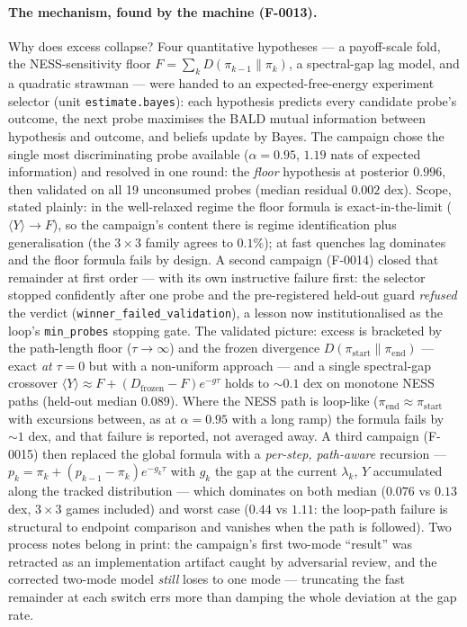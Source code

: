 \paragraph{The mechanism, found by the machine (F-0013).} Why does excess
collapse? Four quantitative hypotheses — a payoff-scale fold, the
NESS-sensitivity floor $F = \sum_k D(\pi_{k-1}\|\pi_k)$, a spectral-gap lag
model, and a quadratic strawman — were handed to an expected-free-energy
experiment selector (unit \texttt{estimate.bayes}): each hypothesis predicts
every candidate probe's outcome, the next probe maximises the BALD mutual
information between hypothesis and outcome, and beliefs update by Bayes. The
campaign chose the single most discriminating probe available
($\alpha = 0.95$, $1.19$ nats of expected information) and resolved in one
round: the \emph{floor} hypothesis at posterior $0.996$, then validated on
all 19 unconsumed probes (median residual $0.002$ dex). Scope, stated
plainly: in the well-relaxed regime the floor formula is exact-in-the-limit
($\langle Y\rangle \to F$), so the campaign's content there is regime
identification plus generalisation (the $3{\times}3$ family agrees to
$0.1\%$); at fast quenches lag dominates and the floor formula fails by design.
A second campaign (F-0014) closed that remainder at first order — with its
own instructive failure first: the selector stopped confidently after one
probe and the pre-registered held-out guard \emph{refused} the verdict
(\texttt{winner\_failed\_validation}), a lesson now institutionalised as
the loop's \texttt{min\_probes} stopping gate. The validated picture:
excess is bracketed by the path-length floor ($\tau \to \infty$) and the
frozen divergence $D(\pi_{\mathrm{start}}\|\pi_{\mathrm{end}})$ — exact
\emph{at} $\tau = 0$ but with a non-uniform approach — and a single
spectral-gap crossover $\langle Y\rangle \approx F + (D_{\mathrm{frozen}}
- F)e^{-g\tau}$ holds to $\sim 0.1$ dex on monotone NESS paths (held-out
median $0.089$). Where the NESS path is loop-like ($\pi_{\mathrm{end}}
\approx \pi_{\mathrm{start}}$ with excursions between, as at
$\alpha = 0.95$ with a long ramp) the formula fails by $\sim 1$ dex, and
that failure is reported, not averaged away. A third campaign (F-0015)
then replaced the global formula with a \emph{per-step, path-aware}
recursion — $p_k = \pi_k + (p_{k-1} - \pi_k)e^{-g_k\tau}$ with $g_k$ the
gap at the current $\lambda_k$, $Y$ accumulated along the tracked
distribution — which dominates on both median ($0.076$ vs $0.13$ dex,
$3{\times}3$ games included) and worst case ($0.44$ vs $1.11$: the
loop-path failure is structural to endpoint comparison and vanishes when
the path is followed). Two process notes belong in print: the campaign's
first two-mode ``result'' was retracted as an implementation artifact
caught by adversarial review, and the corrected two-mode model
\emph{still} loses to one mode — truncating the fast remainder at each
switch errs more than damping the whole deviation at the gap rate.

